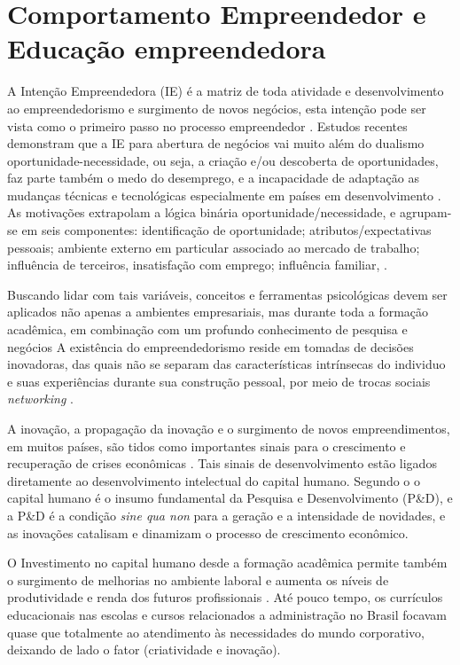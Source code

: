 \section{Comportamento Empreendedor e Educação empreendedora}


A Intenção Empreendedora (IE) é a matriz de toda atividade e desenvolvimento ao empreendedorismo e surgimento de novos negócios, esta intenção pode ser vista como o primeiro passo no processo empreendedor \cite{zhao_relationship_2010, shirokova_exploring_2016}. Estudos recentes demonstram que a IE para abertura de negócios vai muito além do dualismo oportunidade-necessidade, ou seja, a criação e/ou descoberta de oportunidades, faz parte também o medo do desemprego, e a  incapacidade de adaptação as mudanças técnicas e tecnológicas especialmente em países em desenvolvimento \cite{vale_motivacoes_2014}. As motivações extrapolam a lógica binária oportunidade/necessidade, e agrupam-se em seis componentes: identificação  de  oportunidade;  atributos/expectativas pessoais; ambiente  externo em particular associado ao mercado de trabalho; influência  de  terceiros, insatisfação com emprego; influência familiar, \cite{vale_motivacoes_2014, rodrigues_intencao_2019,ferreira_intencao_2017}.

Buscando lidar com tais variáveis, conceitos e ferramentas psicológicas devem ser aplicados não apenas a ambientes empresariais, mas durante toda a formação acadêmica, em combinação com um profundo conhecimento de pesquisa e negócios \cite{zhao_relationship_2010} A existência do empreendedorismo reside em tomadas de decisões inovadoras, das quais não se separam das características intrínsecas do individuo e suas experiências durante sua construção pessoal, por meio de trocas sociais \textit{networking} \cite{de_souza_alencar_intencao_2019}.

A inovação, a propagação da inovação e o surgimento de novos empreendimentos, em muitos países, são tidos como importantes sinais para o crescimento e recuperação de crises econômicas \cite{silva_mudancestrutural_2017}. Tais sinais de desenvolvimento estão ligados diretamente ao desenvolvimento intelectual do capital humano. Segundo o  o capital humano é o insumo fundamental da Pesquisa e Desenvolvimento (P\&D), e a P\&D é a condição \textit{sine qua non} para a geração e a intensidade de novidades, e as inovações catalisam e dinamizam o processo de crescimento econômico.

O Investimento no  capital  humano desde a formação acadêmica permite também o surgimento de melhorias no ambiente laboral e aumenta os níveis de produtividade e renda dos futuros profissionais \cite{macedo_capital_2019}. Até pouco tempo, os currículos educacionais nas escolas e cursos relacionados a administração no Brasil focavam quase que totalmente ao atendimento às necessidades do mundo corporativo, deixando de lado o fator (criatividade e inovação). 

